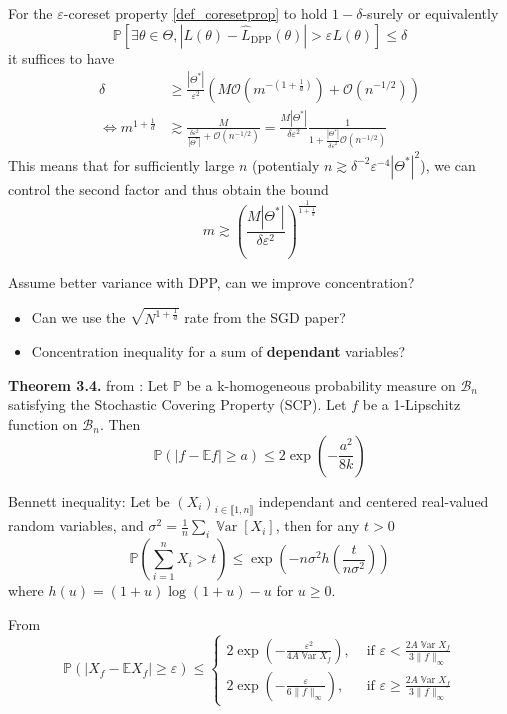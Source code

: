 \documentclass{article} %
\renewcommand{\epsilon}{\varepsilon}
\newcommand{\PP}{\mathbb{P}}
\newcommand{\OO}{\mathcal{O}}
\newcommand{\Var}{\operatorname{\mathbb V ar}}
\newcommand{\1}{\mathds{1}} %
\newcommand{\intint}[2]{\llbracket #1,#2 \rrbracket} %
\theoremstyle{definition} %
\begin{document}
For the $\epsilon$-coreset property \ref{def_coresetprop} to hold $1-\delta$-surely or equivalently  
\begin{equation}
	\PP \left[ \exists \theta \in \Theta,  |L(\theta)-\hat L_{\textrm{DPP}}(\theta)|>\epsilon L(\theta)\right] \leq \delta
\end{equation}
it suffices to have
\begin{align}
	\delta &\geq \frac{|\Theta^*|}{\epsilon^2} (M \OO(m^{-(1+\frac 1 d)}) + \OO(n^{-1/2})) \\
	\iff m^{1+\frac 1 d} &\gtrsim \frac{M}{\frac{\delta \epsilon^2}{|\Theta^*|} + \OO(n^{-1/2})} = \frac{M |\Theta^*|}{\delta \epsilon^2} \frac{1}{1 + \frac{|\Theta^*|}{\delta \epsilon^2}\OO(n^{-1/2})}
\end{align}
This means that for sufficiently large $n$ (potentialy $n\gtrsim \delta^{-2} \epsilon^{-4} |\Theta^*|^2$), we can control the second factor and thus obtain the bound
\begin{equation}
	\boxed{m \gtrsim \left(\frac{M |\Theta^*|}{\delta \epsilon^2}\right) ^{\frac{1}{1+\frac 1 d}} }
\end{equation}




\begin{tcolorbox}
	Assume better variance with DPP, can we improve concentration?
\begin{itemize}
	\item Can we use the $\sqrt {N^{1 + \frac 1 d}}$ rate from the SGD paper?
	\item Concentration inequality for a sum of \textbf{dependant} variables?
\end{itemize}
\end{tcolorbox}

\textbf{Theorem 3.4.} from \cite{pemantle2011rayleighconcentration}: Let $\mathbb{P}$ be a k-homogeneous probability measure on $\mathcal{B}_{n}$ satisfying the Stochastic Covering Property (SCP). Let $f$ be a 1-Lipschitz function on $\mathcal{B}_{n}$. Then
$$
\mathbb{P}(\lvert f-\mathbb{E} f \rvert \geq a) \leq 2 \exp \left(-\frac{a^{2}}{8 k}\right)
$$

Bennett inequality: Let be $(X_i)_{i\in \intint{1}{n}}$ independant and centered real-valued random variables, and $\sigma^2 = \frac{1}{n}\sum_i \Var[X_i]$, then for any $t>0$
$$
\mathbb{P}\left(\sum_{i=1}^{n} X_{i}>t\right) \leq \exp \left(-n \sigma^{2} h\left(\frac{t}{n \sigma^{2}}\right)\right)
$$
where $h(u)=(1+u) \log (1+u)-u$ for $u \geq 0$.


From \cite{breuer2013nevai} $$\PP\left(\left|X_f-\mathbb{E} X_f\right| \geq \epsilon\right) \leq \begin{cases}2 \exp \left(-\frac{\epsilon^2}{4 A \Var X_f}\right), & \text { if } \epsilon<\frac{2 A \Var X_f}{3\|f\|_{\infty}} \\ 2 \exp \left(-\frac{\epsilon}{6\|f\|_{\infty}}\right), & \text { if } \epsilon \geq \frac{2 A \Var X_f}{3\|f\|_{\infty}}\end{cases}$$
\end{document}
